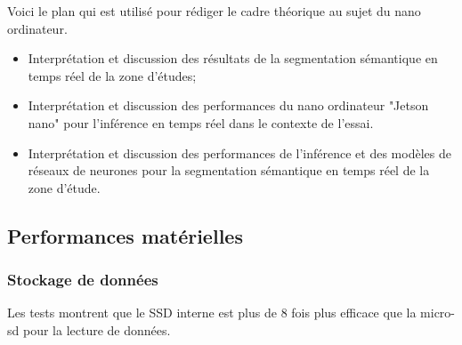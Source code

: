 ﻿{\color{red}
\par Voici le plan qui est utilisé pour rédiger le cadre théorique au sujet du nano ordinateur.
\begin{itemize}
   \item Interprétation et discussion des résultats de la segmentation sémantique en temps réel de la zone d’études;
   \item Interprétation et discussion des performances du nano ordinateur "Jetson nano" pour  l'inférence en temps réel dans le contexte de l'essai.
   \item Interprétation et discussion des performances de l'inférence et des modèles de réseaux de neurones pour la segmentation sémantique en temps réel de la zone d’étude.
\end{itemize}
}
\subsection{Performances matérielles}
\subsubsection{Stockage de données}
\par Les tests montrent que le SSD interne est plus de 8 fois plus efficace que la micro-sd pour la lecture de données. 
